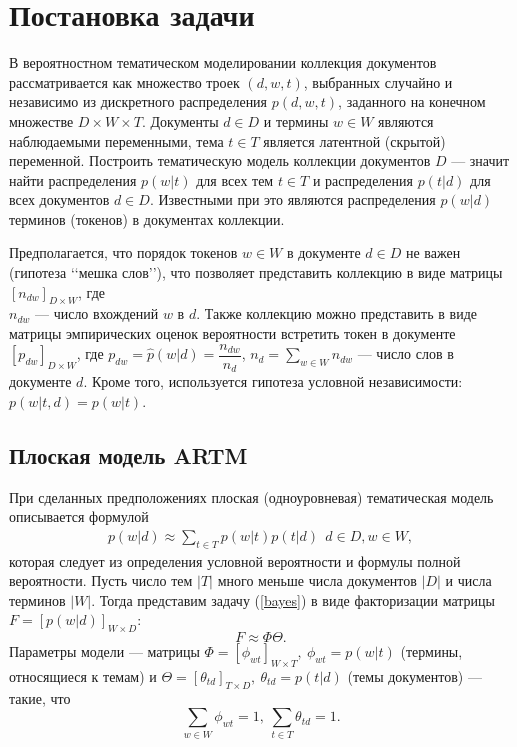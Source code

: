 \chapter{Постановка задачи}

В вероятностном тематическом моделировании коллекция документов рассматривается как множество троек $(d, w, t)$, выбранных случайно и независимо из дискретного распределения $p(d, w, t)$, заданного на конечном множестве $D \times W \times T$. Документы $d \in  D$ и термины $w \in W$ являются наблюдаемыми переменными, 
тема $t \in T$ является латентной (скрытой) переменной. Построить тематическую модель коллекции документов $D$ — значит найти
распределения $p(w |t)$ для всех тем $t \in T$ и распределения $p(t| d)$  для всех документов $d \in  D$. Известными при это являются распределения $p(w|d)$ терминов 
(токенов) в документах коллекции.

Предполагается, что порядок токенов $w \in W$ в документе $d \in D$ не важен (гипотеза \lq\lq{мешка слов}\rq\rq{}), что позволяет представить коллекцию в виде матрицы $[n_{dw} ]_{D \times W}$, где\\ $n_{dw}$ --- число вхождений $w$ в $d$. Также коллекцию можно представить в виде матрицы эмпирических оценок вероятности встретить токен в документе $[p_{dw}]_{D\times W}$, где $p_{dw}=\hat p(w|d) = \dfrac {n_{dw}}{n_d}$, $n_d = \sum\limits_{w \in W} n_{dw}$ --- число слов в документе $d$. Кроме того, используется гипотеза условной независимости: $p(w|t,d)=p(w|t)$.

\section{Плоская модель ARTM}
При сделанных предположениях плоская (одноуровневая) тематическая модель описывается формулой 
\begin{align} 
p(w|d) \approx \sum\limits_{t \in T}  p(w|t)p(t|d) \ \ d\in D, w \in W, \tag{*}\label{bayes}
\end{align}
которая следует из определения условной вероятности и формулы полной вероятности.
Пусть число тем $|T|$ много меньше числа документов $|D|$ и числа терминов $|W|$. Тогда представим задачу (\ref{bayes}) в виде факторизации матрицы $F =[p(w|d)]_{W \times D} $: $$F \approx \Phi \Theta.$$
Параметры модели --- матрицы $\Phi = [\phi_{wt}]_{W \times T}, \ \phi_{wt}=p(w|t)$ (термины, относящиеся к темам) и $\Theta = [\theta_{td}]_{T \times D}, \ \theta_{td}=p(t|d)$ (темы документов) --- такие, что $$\sum\limits_{w \in W} \phi_{wt} = 1, \ \sum\limits_{t \in T} \theta_{td} = 1.$$ 

